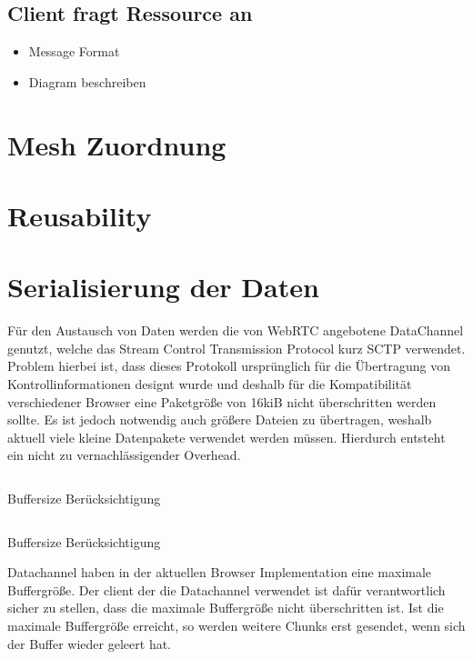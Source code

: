 \subsection{Client fragt Ressource an}
\begin{itemize}
	\item Message Format
	\item Diagram beschreiben
\end{itemize}
\section{Mesh Zuordnung}

\section{Reusability}

\section{Serialisierung der Daten}
Für den Austausch von Daten werden die von WebRTC angebotene DataChannel genutzt, welche das Stream Control Transmission Protocol kurz SCTP verwendet. Problem hierbei ist, dass dieses Protokoll ursprünglich für die Übertragung von Kontrollinformationen designt wurde und deshalb für die Kompatibilität verschiedener Browser eine Paketgröße von 16kiB nicht überschritten werden sollte. Es ist jedoch notwendig auch größere Dateien zu übertragen, weshalb aktuell viele kleine Datenpakete verwendet werden müssen. Hierdurch entsteht ein nicht zu vernachlässigender Overhead.

\begin{listing}[h]
	\inputminted{javascript}{listings/buffersize.js}
	\caption{Buffersize Berücksichtigung}
	\label{lst:code-buffersize}
\end{listing}
\begin{listing}[h]
	\inputminted{javascript}{listings/handle_chunk.js}
	\caption{Buffersize Berücksichtigung}
	\label{lst:code-handle-chunk}
\end{listing}

Datachannel haben in der aktuellen Browser Implementation eine maximale Buffergröße. Der client der die Datachannel verwendet ist dafür verantwortlich sicher zu stellen, dass die maximale Buffergröße nicht überschritten ist. Ist die maximale Buffergröße erreicht, so werden weitere Chunks erst gesendet, wenn sich der Buffer wieder geleert hat.


